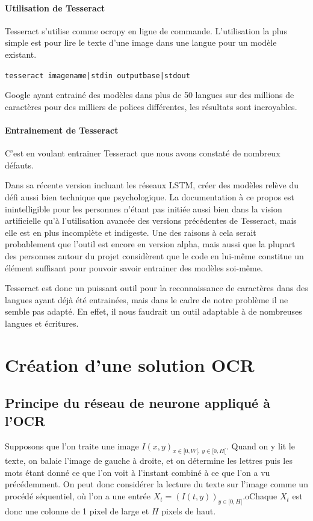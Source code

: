 \documentclass{report}
\begin{document}
\subsubsection{Utilisation de Tesseract}

Tesseract s'utilise comme ocropy en ligne de commande.
L'utilisation la plus simple est pour lire le texte d'une image dans une langue pour un modèle existant.

\texttt{tesseract imagename|stdin outputbase|stdout}

Google ayant entrainé des modèles dans plus de 50 langues sur des millions de caractères pour des milliers de polices différentes, les résultats sont incroyables.

\subsubsection{Entrainement de Tesseract}

C'est en voulant entrainer Tesseract que nous avons constaté de nombreux défauts.

Dans sa récente version incluant les réseaux LSTM, créer des modèles relève du défi aussi bien technique que psychologique.
La documentation à ce propos est inintelligible pour les personnes n'étant pas initiée aussi bien dans la vision artificielle qu'à l'utilisation avancée des versions précédentes de Tesseract, mais elle est en plus incomplète et indigeste.
Une des raisons à cela serait probablement que l'outil est encore en version alpha, mais aussi que la plupart des personnes autour du projet considèrent que le code en lui-même constitue un élément suffisant pour pouvoir savoir entrainer des modèles soi-même.

Tesseract est donc un puissant outil pour la reconnaissance de caractères dans des langues ayant déjà été entrainées, mais dans le cadre de notre problème il ne semble pas adapté.
En effet, il nous faudrait un outil adaptable à de nombreuses langues et écritures.

\chapter{Création d'une solution OCR}

\section{Principe du réseau de neurone appliqué à l'OCR}

Supposons que l'on traite une image $I(x, y)_{x \in [0, W[,\ y \in [0, H[}$.
Quand on y lit le texte, on balaie l'image de gauche à droite, et on détermine les lettres puis les mots étant donné ce que l'on voit à l'instant combiné à ce que l'on a vu précédemment.
On peut donc considérer la lecture du texte sur l'image comme un procédé séquentiel, où l'on a une entrée $X_t = \left(I(t, y)\right)_{y\in [0, H[}$.oChaque $X_t$ est donc une colonne de 1 pixel de large et $H$ pixels de haut.
\end{document}
